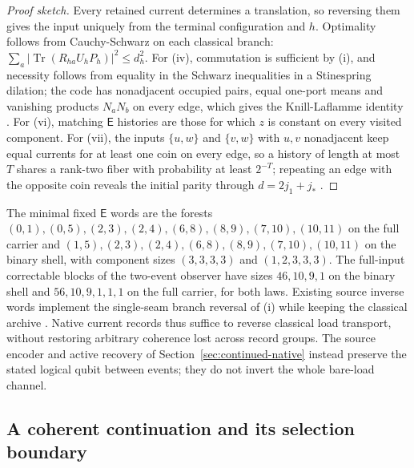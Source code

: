 \documentclass[11pt]{article}
\theoremstyle{definition}
\theoremstyle{remark}
\theoremstyle{plain}
\newcommand{\Tr}{\operatorname{Tr}}
\newcommand{\En}{\mathsf{E}}
\begin{document}
\begin{proof}[Proof sketch]
Every retained current determines a translation, so reversing them gives the
input uniquely from the terminal configuration and $h$. Optimality follows
from Cauchy-Schwarz on each classical branch:
$\sum_a\lvert\Tr(R_{ha}U_hP_h)\rvert^2\le d_h^2$. For (iv), commutation is
sufficient by (i), and necessity follows from equality in the Schwarz
inequalities in a Stinespring dilation; the code has nonadjacent occupied
pairs, equal one-port means and vanishing products $N_aN_b$ on every edge,
which gives the Knill-Laflamme identity \cite{knill1997}. For (vi), matching
$\En$ histories are those for which $z$ is constant on every visited
component. For (vii), the inputs $\{u,w\}$ and $\{v,w\}$ with $u,v$
nonadjacent keep equal currents for at least one coin on every edge, so a
history of length at most $T$ shares a rank-two fiber with probability at
least $2^{-T}$; repeating an edge with the opposite coin reveals the initial
parity through $d=2j_1+j_*$ \cite{oRR,rRR}.
\end{proof}

The minimal fixed $\En$ words are the forests $(0,1),(0,5),(2,3),(2,4),
(6,8),(8,9),(7,10),(10,11)$ on the full carrier and
$(1,5),(2,3),(2,4),(6,8),(8,9),(7,10),(10,11)$ on the binary shell, with
component sizes $(3,3,3,3)$ and $(1,2,3,3,3)$. The full-input correctable
blocks of the two-event observer have sizes $46,10,9,1$ on the binary shell
and $56,10,9,1,1,1$ on the full carrier, for both laws. Existing source
inverse words implement the single-seam branch reversal of (i) while keeping
the classical archive \cite{oRR,rRR}. Native current
records thus suffice to reverse classical load transport, without restoring
arbitrary coherence lost across record groups. The source encoder and active
recovery of Section~\ref{sec:continued-native} instead preserve the stated
logical qubit between events; they do not invert the whole bare-load channel.

\subsection{A coherent continuation and its selection boundary}
\label{sec:coherent-continuation}
\end{document}
